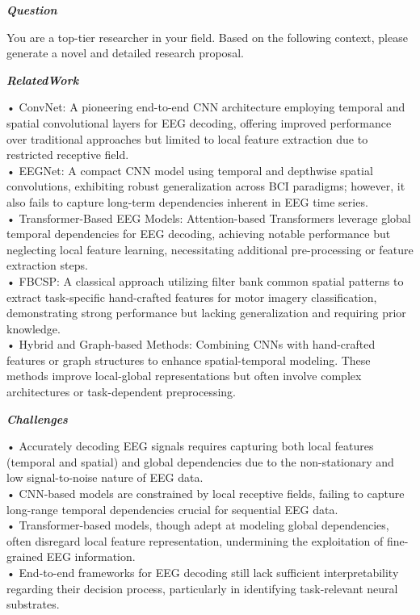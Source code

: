 \begin{tcolorbox}[
    breakable,
    title={Example of Idea Generation in Neuroscience},
    colback=LighterGray,
    colframe=DeepPurple,
    colbacktitle=DeepPurple,
    coltitle=White,
]
\textbf{\emph{\textcolor{DeepPurple}{Question}}}

You are a top-tier researcher in your field. Based on the following context, please generate a novel and detailed research proposal.

\textbf{\emph{\textcolor{CaseOrange}{RelatedWork}}}

• ConvNet: A pioneering end-to-end CNN architecture employing temporal and spatial convolutional layers for EEG decoding, offering improved performance over traditional approaches but limited to local feature extraction due to restricted receptive field. \\
• EEGNet: A compact CNN model using temporal and depthwise spatial convolutions, exhibiting robust generalization across BCI paradigms; however, it also fails to capture long-term dependencies inherent in EEG time series. \\
• Transformer-Based EEG Models: Attention-based Transformers leverage global temporal dependencies for EEG decoding, achieving notable performance but neglecting local feature learning, necessitating additional pre-processing or feature extraction steps. \\
• FBCSP: A classical approach utilizing filter bank common spatial patterns to extract task-specific hand-crafted features for motor imagery classification, demonstrating strong performance but lacking generalization and requiring prior knowledge. \\
• Hybrid and Graph-based Methods: Combining CNNs with hand-crafted features or graph structures to enhance spatial-temporal modeling. These methods improve local-global representations but often involve complex architectures or task-dependent preprocessing. 

\textbf{\emph{\textcolor{CaseOrange}{Challenges}}}

• Accurately decoding EEG signals requires capturing both local features (temporal and spatial) and global dependencies due to the non-stationary and low signal-to-noise nature of EEG data. \\
• CNN-based models are constrained by local receptive fields, failing to capture long-range temporal dependencies crucial for sequential EEG data. \\
• Transformer-based models, though adept at modeling global dependencies, often disregard local feature representation, undermining the exploitation of fine-grained EEG information. \\
• End-to-end frameworks for EEG decoding still lack sufficient interpretability regarding their decision process, particularly in identifying task-relevant neural substrates. 


\end{tcolorbox}
